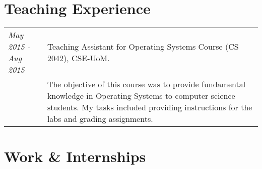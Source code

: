 \documentclass[a4paper,10pt]{article}
\begin{document}
\section{Teaching Experience}
\begin{tabular}{p{3cm}p{13.5cm}}

\emph{May 2015 - Aug 2015} & Teaching Assistant for Operating Systems Course (CS 2042), CSE-UoM.\\
&\footnotesize{The objective of this course was to provide fundamental knowledge in Operating Systems to computer science students. My tasks included providing instructions for the labs and grading assignments.}
\end{tabular}


\section{Work \& Internships}
\end{document}
